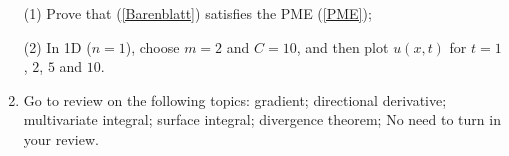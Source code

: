 \documentclass[6pt]{article}
\numberwithin{equation}{section}
\begin{document}
\begin{enumerate}
(1) Prove that (\ref{Barenblatt}) satisfies the PME (\ref{PME});

(2)  In 1D ($n=1$), choose $m=2$ and $C=10$, and then plot $u(x,t)$ for $t=1$, $2$, $5$ and $10$.


\item  Go to review on the following topics: gradient; directional derivative; multivariate integral; surface integral; divergence theorem; No need to turn in your review. 

\end{enumerate}
\end{document}

